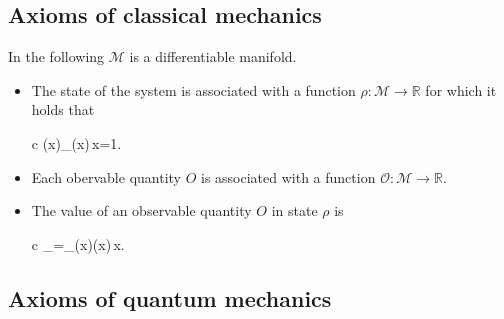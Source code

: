 \documentclass[11pt,%
]{memoir}
\newenvironment{eqna}{\begin{IEEEeqnarray}{c}}{\end{IEEEeqnarray}\ignorespacesafterend}
\newcommand{\RR}{\mathbb{R}}
\newcommand{\dd}{\mathrm{d}}
\begin{document}

\newpage

\subsection{Axioms of classical mechanics}

In the following \(\mathcal{M}\) is a differentiable manifold.

\begin{itemize}
    \item The state of the system is associated with a function \(\rho:\mathcal{M}\rightarrow\RR\) for which it holds that 
    \begin{eqna}
        \rho(x)\qquad{}\qquad\int_\rho(x)\,\dd x=1.\nonumber
    \end{eqna}
    \item Each obervable quantity \(O\) is associated with a function \(\mathcal{O}:\mathcal{M}\rightarrow\RR\).
    \item The value of an observable quantity \(O\) in state \(\rho\) is
    \begin{eqna}
        \langle{}\rangle_\rho=\int_\rho(x)(x)\,\dd x.\nonumber
    \end{eqna}
\end{itemize}

\subsection{Axioms of quantum mechanics}
\end{document}

